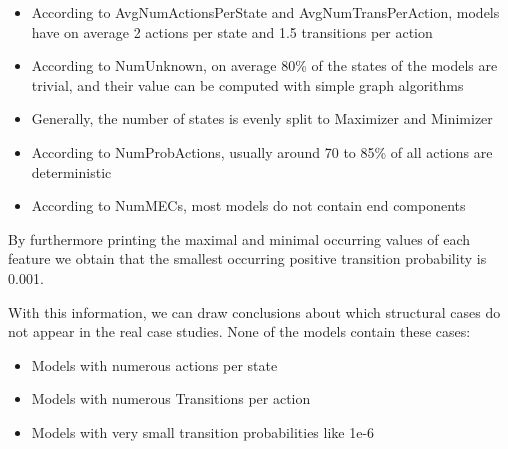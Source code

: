 \begin{itemize}
    \item According to AvgNumActionsPerState and AvgNumTransPerAction, models have on average 2 actions per state and 1.5 transitions per action
    \item According to NumUnknown, on average 80\% of the states of the models are trivial, and their value can be computed with simple graph algorithms 
    \item Generally, the number of states is evenly split to Maximizer and Minimizer
    \item According to NumProbActions, usually around 70 to 85\% of all actions are deterministic
    \item According to NumMECs, most models do not contain end components
\end{itemize}

By furthermore printing the maximal and minimal occurring values of each feature we obtain that the smallest occurring positive transition probability is 0.001.

With this information, we can draw conclusions about which structural cases do not appear in the real case studies. 
None of the models contain these cases:
\begin{itemize}
    \item Models with numerous actions per state
    \item Models with numerous Transitions per action
    \item Models with very small transition probabilities like 1e-6
\end{itemize}

